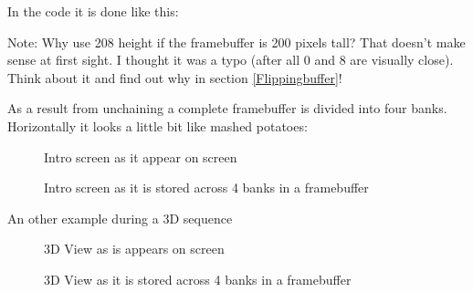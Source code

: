 \documentclass[book.tex]{subfiles}
\begin{document}
In the code it is done like this:\\
\par
 \begin{minipage}{\textwidth}

\end{minipage}
\par

Note: Why use 208 height if the framebuffer is 200 pixels tall? That doesn't make sense at first sight. I thought it was a typo (after all 0 and 8 are visually close). Think about it and find out why in section \ref{Flippingbuffer}!\\
\par


As a result from unchaining a complete framebuffer is divided into four banks. Horizontally it looks a little bit like mashed potatoes:
 \begin{figure}[H]
\centering
 \caption{Intro screen as it appear on screen}
 \end{figure}
 \par
 \begin{figure}[H]
\centering
 \caption{Intro screen as it is stored across 4 banks in a framebuffer} \label{fig:vga_layout_for_intro}
 \end{figure}
\par
An other example during a 3D sequence
\begin{figure}[H]
\centering
 \caption{3D View as is appears on screen} \label{fig:vga_layout_in_3D}
 \end{figure}
 \par

 \begin{figure}[H]
\centering
 \caption{3D View as it is stored across 4 banks in a framebuffer}
 \end{figure}
\end{document}
